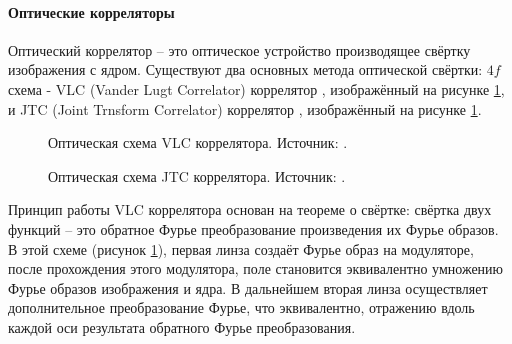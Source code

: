 \paragraph{Оптические корреляторы}
Оптический коррелятор -- это оптическое устройство производящее свёртку изображения с ядром. Существуют два основных метода оптической свёртки: $4f$ схема - VLC (Vander Lugt Correlator) коррелятор \cite{lugt1964signal}, изображённый на рисунке \ref{ris:VLC}, и JTC (Joint Trnsform Correlator) коррелятор \cite{weaver1966technique}, изображённый на рисунке \ref{ris:VLC}.
\begin{figure}[h]
	\caption{Оптическая схема VLC коррелятора. Источник: \cite{goncharov2019features}.}
	\label{ris:VLC}
\end{figure}
\begin{figure}[h]
	\caption{Оптическая схема JTC коррелятора. Источник: \cite{alfalou2009optical}.}
	\label{ris:JTC}
\end{figure}
Принцип работы VLC коррелятора основан на теореме о свёртке: свёртка двух функций -- это обратное Фурье преобразование произведения их Фурье образов. В этой схеме (рисунок \ref{ris:VLC}), первая линза создаёт Фурье образ \cite{goodman2005introduction} на модуляторе, после прохождения этого модулятора, поле становится эквивалентно умножению Фурье образов изображения и ядра. В дальнейшем вторая линза осуществляет дополнительное преобразование Фурье, что эквивалентно, отражению вдоль каждой оси результата обратного Фурье преобразования.
